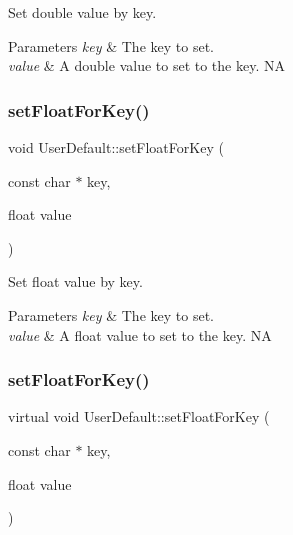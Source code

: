 Set double value by key. 
\begin{DoxyParams}{Parameters}
{\em key} & The key to set. \\
\hline
{\em value} & A double value to set to the key.  NA \\
\hline
\end{DoxyParams}
\mbox{\label{classUserDefault_a3b767898ff245bbf2a94afc1caf70fc7}} 
\subsubsection{\texorpdfstring{set\+Float\+For\+Key()}{setFloatForKey()}\hspace{0.1cm}{\footnotesize\ttfamily [1/2]}}
{\footnotesize\ttfamily void User\+Default\+::set\+Float\+For\+Key (\begin{DoxyParamCaption}\item[{const char $\ast$}]{key,  }\item[{float}]{value }\end{DoxyParamCaption})\hspace{0.3cm}{\ttfamily [virtual]}}

Set float value by key. 
\begin{DoxyParams}{Parameters}
{\em key} & The key to set. \\
\hline
{\em value} & A float value to set to the key.  NA \\
\hline
\end{DoxyParams}
\mbox{\label{classUserDefault_ad8f05807ed0d3715f253cb25faa1a297}} 
\subsubsection{\texorpdfstring{set\+Float\+For\+Key()}{setFloatForKey()}\hspace{0.1cm}{\footnotesize\ttfamily [2/2]}}
{\footnotesize\ttfamily virtual void User\+Default\+::set\+Float\+For\+Key (\begin{DoxyParamCaption}\item[{const char $\ast$}]{key,  }\item[{float}]{value }\end{DoxyParamCaption})\hspace{0.3cm}{\ttfamily [virtual]}}


